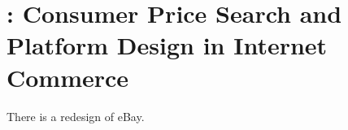 \section{\cite{dinerstein2018consumer}: Consumer Price Search and Platform Design in Internet Commerce}
There is a redesign of eBay.